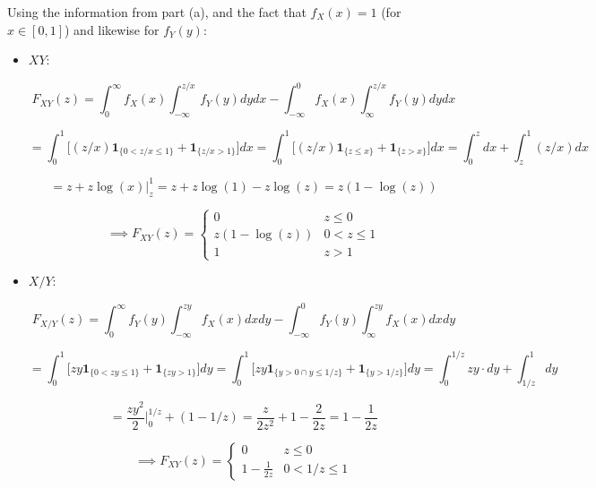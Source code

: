 \begin{solution}



Using the information from part (a), and the fact that \(f_X(x) = 1\) (for \(x \in [0, 1]\)) and likewise for \(f_Y(y)\):

\begin{itemize}

\item \(XY\):

\[
F_{XY}(z) = \int_0^\infty f_X(x) \int_{-\infty}^{z/x} f_Y(y) dy dx - \int_{-\infty}^0 f_X(x) \int_{\infty}^ {z/x} f_Y(y) dy dx
\]

\[
= \int_0^1  \big[ (z/x) \boldsymbol{1}_{\{0 < z/x \leq 1\}} + \boldsymbol{1}_{\{z/x > 1\}} \big] dx = \int_0^1  \big[ (z/x) \boldsymbol{1}_{\{z \leq x\}} + \boldsymbol{1}_{\{z > x\}} \big] dx = \int_0^z dx + \int_z^1 (z/x) dx
\]

\[
=z + z \log(x) \big|_z^1 = z + z \log(1) - z \log(z) = z (1 - \log(z))
\]

\[
\implies \boxed{ F_{XY}(z) =  \begin{cases} 
     0   &  z \leq 0 \\
     z (1 - \log(z)) & 0 < z \leq 1 \\
   1 & z > 1\end{cases}}
\]

\item \(X/Y\):

\[
F_{X/Y}(z) =\int_0^\infty f_Y(y) \int_{-\infty}^{zy} f_X(x) dx dy - \int_{-\infty}^0 f_Y(y) \int_{\infty}^ {zy} f_X(x) dx dy
\]

\[
= \int_0^1  \big[ zy \boldsymbol{1}_{\{0 < zy \leq 1\}} + \boldsymbol{1}_{\{zy > 1\}} \big] dy = \int_0^1  \big[ zy \boldsymbol{1}_{\{y >0 \cap y \leq 1/z\}} + \boldsymbol{1}_{\{y > 1/z\}} \big] dy = \int_0^{1/z}zy \cdot dy + \int_{1/z}^1 dy
\]

\[
=\frac{zy^2}{2} \bigg|_0^{1/z}+ (1 - 1/z) = \frac{z}{2z^2} + 1 - \frac{2}{2z} = 1 - \frac{1}{2z}
\]

\[
\implies  F_{XY}(z) =  \begin{cases} 
     0   & z \leq 0 \\
     1 - \frac{1}{2z} & 0 < 1/z \leq 1 
     \end{cases}
\]


\end{itemize}
\end{solution}
